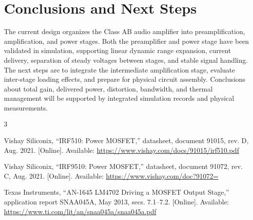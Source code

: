 \documentclass[conference]{IEEEtran}
\begin{document}
\balance

\section{Conclusions and Next Steps}
The current design organizes the Class AB audio amplifier into preamplification, amplification, and power stages. Both the preamplifier and power stage have been validated in simulation, supporting linear dynamic range expansion, current delivery, separation of steady voltages between stages, and stable signal handling. The next steps are to integrate the intermediate amplification stage, evaluate inter-stage loading effects, and prepare for physical circuit assembly. Conclusions about total gain, delivered power, distortion, bandwidth, and thermal management will be supported by integrated simulation records and physical measurements.

\begin{thebibliography}{3}

Vishay Siliconix, ``IRF510: Power MOSFET,'' datasheet, document 91015, rev. D, Aug. 2021. [Online]. Available: \url{https://www.vishay.com/docs/91015/irf510.pdf}

Vishay Siliconix, ``IRF9510: Power MOSFET,'' datasheet, document 91072, rev. C, Aug. 2021. [Online]. Available: \url{https://www.vishay.com/doc?91072=}

Texas Instruments, ``AN-1645 LM4702 Driving a MOSFET Output Stage,'' application report SNAA045A, May 2013, secs. 7.1--7.2. [Online]. Available: \url{https://www.ti.com/lit/an/snaa045a/snaa045a.pdf}

\end{thebibliography}
\end{document}
